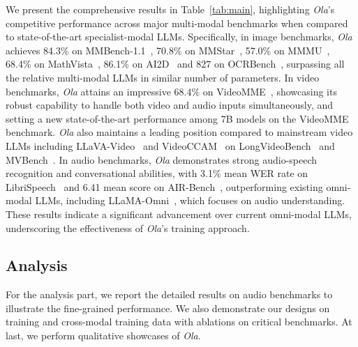We present the comprehensive results in Table~\ref{tab:main}, highlighting \textit{Ola}'s competitive performance across major multi-modal benchmarks when compared to state-of-the-art specialist-modal LLMs. Specifically, in image benchmarks, \emph{Ola} achieves 84.3\% on MMBench-1.1~\citep{liu2023mmbench}, 70.8\% on MMStar~\citep{chen2024mmstar}, 57.0\% on MMMU~\citep{yue2024mmmu}, 68.4\% on MathVista~\citep{lu2023mathvista}, 86.1\% on AI2D~\citep{kembhavi2016ai2d} and 827 on OCRBench~\citep{liu2023ocrbench}, surpassing all the relative multi-modal LLMs in similar number of parameters. In video benchmarks, \textit{Ola} attains an impressive 68.4\% on VideoMME~\citep{fu2024videomme}, showcasing its robust capability to handle both video and audio inputs simultaneously, and setting a new state-of-the-art performance among 7B models on the VideoMME benchmark. \emph{Ola} also maintains a leading position compared to mainstream video LLMs including LLaVA-Video~\citep{zhang2024videoinstructiontuningsynthetic} and VideoCCAM~\citep{fei2024videoccam} on LongVideoBench~\citep{wu2024longvideobench} and MVBench~\citep{li2024mvbench}. In audio benchmarks, \textit{Ola} demonstrates strong audio-speech recognition and conversational abilities, with 3.1\% mean WER rate on LibriSpeech~\citep{panayotov2015librispeech} and 6.41 mean score on AIR-Bench~\citep{yang2024airbench}, outperforming existing omni-modal LLMs, including LLaMA-Omni~\citep{fang2024llamaomni}, which focuses on audio understanding. These results indicate a significant advancement over current omni-modal LLMs, underscoring the effectiveness of \textit{Ola}'s training approach.

\subsection{Analysis} \label{sec:exp_analysis}

For the analysis part, we report the detailed results on audio benchmarks to illustrate the fine-grained performance. We also demonstrate our designs on training and cross-modal training data with ablations on critical benchmarks. At last, we perform qualitative showcases of \textit{Ola}. 


